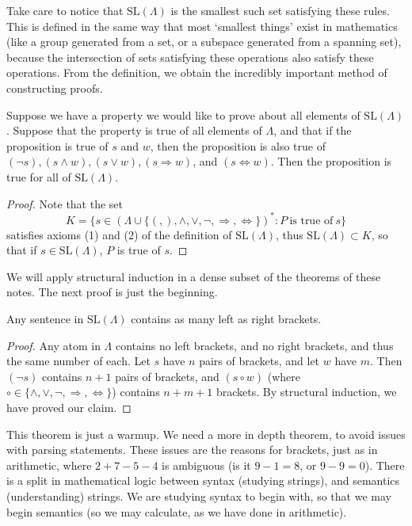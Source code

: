 Take care to notice that $\text{SL}(\Lambda)$ is the smallest such set satisfying these rules. This is defined in the same way that most `smallest things' exist in mathematics (like a group generated from a set, or a subspace generated from a spanning set), because the intersection of sets satisfying these operations also satisfy these operations. From the definition, we obtain the incredibly important method of constructing proofs.

\begin{theorem}
    Suppose we have a property we would like to prove about all elements of $\text{SL}(\Lambda)$. Suppose that the property is true of all elements of $\Lambda$, and that if the proposition is true of $s$ and $w$, then the proposition is also true of $(\neg s), (s \wedge w), (s \vee w), (s \Rightarrow w)$, and $(s \Leftrightarrow w)$. Then the proposition is true for all of $\text{SL}(\Lambda)$.
\end{theorem}
\begin{proof}
    Note that the set
    \[ K = \{ s \in (\Lambda \cup \{ (, ), \wedge, \vee, \neg, \Rightarrow, \Leftrightarrow \})^* : P\ \text{is true of}\ s \} \]
    satisfies axioms (1) and (2) of the definition of $\text{SL}(\Lambda)$, thus $\text{SL}(\Lambda) \subset K$, so that if $s \in \text{SL}(\Lambda)$, $P$ is true of $s$.
\end{proof}

We will apply structural induction in a dense subset of the theorems of these notes. The next proof is just the beginning.

\begin{theorem}
    Any sentence in $\text{SL}(\Lambda)$ contains as many left as right brackets.
\end{theorem}
\begin{proof}
    Any atom in $\Lambda$ contains no left brackets, and no right brackets, and thus the same number of each. Let $s$ have $n$ pairs of brackets, and let $w$ have $m$. Then $(\neg s)$ contains $n + 1$ pairs of brackets, and $(s \circ w)$ (where $\circ \in \{ \wedge, \vee, \neg, \Rightarrow, \Leftrightarrow \}$) contains $n + m + 1$ brackets. By structural induction, we have proved our claim.
\end{proof}

This theorem is just a warmup. We need a more in depth theorem, to avoid issues with parsing statements. These issues are the reasons for brackets, just as in arithmetic, where $2 + 7 - 5 - 4$ is ambiguous (is it $9 - 1 = 8$, or $9 - 9 = 0$). There is a split in mathematical logic between syntax (studying strings), and semantics (understanding) strings. We are studying syntax to begin with, so that we may begin semantics (so we may calculate, as we have done in arithmetic).

